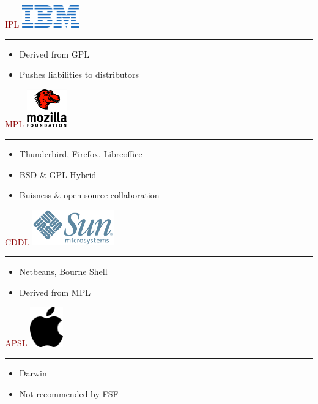 \documentclass[c]{beamer}
\newcommand{\TITLE}{\fontsize{50pt}{1em}\selectfont}
\begin{document}
  \begin{frame}
    \textcolor{darkred}{{\TITLE IPL}}
    \hfill \includegraphics[width=70pt]{ibm} \\
    \vspace{1em} \hrule \vspace{1em}
    \LARGE
    \begin{itemize}
      \item Derived from GPL
      \item Pushes liabilities to distributors
    \end{itemize}
  \end{frame}

  \begin{frame}
    \textcolor{darkred}{{\TITLE MPL}}
    \hfill \includegraphics[width=50pt]{mozilla} \\
    \vspace{1em} \hrule \vspace{1em}
    \LARGE
    \begin{itemize}
    \item Thunderbird, Firefox, Libreoffice
    \item BSD \& GPL Hybrid \\
    \item Buisness \& open source collaboration
    \end{itemize}
  \end{frame}

  \begin{frame}
    \textcolor{darkred}{{\TITLE CDDL}}
    \hfill \includegraphics[width=100pt]{sun} \\
    \vspace{1em} \hrule \vspace{1em}
    \LARGE
    \begin{itemize}
    \item Netbeans, Bourne Shell
    \item Derived from MPL
    \end{itemize}
  \end{frame}

  \begin{frame}
    \textcolor{darkred}{{\TITLE APSL}}
    \hfill \includegraphics[width=40pt]{apple} \\
    \vspace{1em} \hrule \vspace{1em}
    \LARGE
    \begin{itemize}
    \item Darwin
    \item Not recommended by FSF
    \end{itemize}
  \end{frame}

\end{document}
